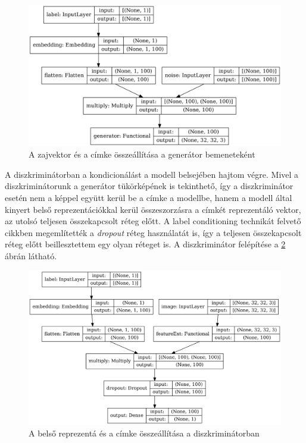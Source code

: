 \begin{figure}[h]
\centering
\includegraphics[width=13cm]{images/label_noise_embedding.png}
\caption{A zajvektor és a címke összeállítása a generátor bemeneteként}
\label{fig:labelnoiseembedding}
\end{figure}

A diszkriminátorban a kondicionálást a modell belsejében hajtom végre. Mivel a diszkriminátorunk a generátor tükörképének is tekinthető, így a diszkriminátor esetén nem a képpel együtt kerül be a címke a modellbe, hanem a modell által kinyert belső reprezentációkkal kerül összeszorzásra a címkét reprezentáló vektor, az utolsó teljesen összekapcsolt réteg előtt. A label conditioning technikát felvető cikkben megemlítették a \textit{dropout} réteg használatát is, így a teljesen összekapcsolt réteg előtt beillesztettem egy olyan réteget is.
A diszkriminátor felépítése a \ref{fig:labeldiscriminator} ábrán látható.

\begin{figure}[h]
\centering
\includegraphics[width=13cm]{images/label_discriminator.png}
\caption{A belső reprezentá és a címke összeállítása a diszkriminátorban}
\label{fig:labeldiscriminator}
\end{figure}

